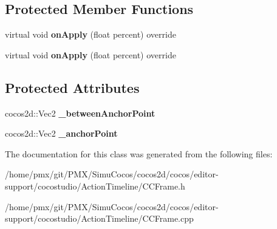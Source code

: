 \subsection*{Protected Member Functions}
\begin{DoxyCompactItemize}
\item 
\mbox{\label{classAnchorPointFrame_a9f0b242cc48e09e7207771fd09883be6}} 
virtual void {\bfseries on\+Apply} (float percent) override
\item 
\mbox{\label{classAnchorPointFrame_ad2ccb3332be96ad4c8578e279a928ea3}} 
virtual void {\bfseries on\+Apply} (float percent) override
\end{DoxyCompactItemize}
\subsection*{Protected Attributes}
\begin{DoxyCompactItemize}
\item 
\mbox{\label{classAnchorPointFrame_a29fceaea42acbf307d5eb7edf826c7c2}} 
cocos2d\+::\+Vec2 {\bfseries \+\_\+between\+Anchor\+Point}
\item 
\mbox{\label{classAnchorPointFrame_a1a43d23fc02dc70c2cca0702d796585e}} 
cocos2d\+::\+Vec2 {\bfseries \+\_\+anchor\+Point}
\end{DoxyCompactItemize}


The documentation for this class was generated from the following files\+:\begin{DoxyCompactItemize}
\item 
/home/pmx/git/\+P\+M\+X/\+Simu\+Cocos/cocos2d/cocos/editor-\/support/cocostudio/\+Action\+Timeline/C\+C\+Frame.\+h\item 
/home/pmx/git/\+P\+M\+X/\+Simu\+Cocos/cocos2d/cocos/editor-\/support/cocostudio/\+Action\+Timeline/C\+C\+Frame.\+cpp\end{DoxyCompactItemize}
